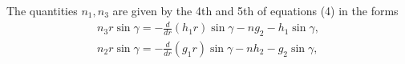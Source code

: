 The quantities \(n_1, n_3\) are given by the 4th and 5th of equations (4) in the forms
\[
\begin{array}{c}
n_3 r \sin \gamma=-\frac{d}{d r}\left(h_1 r\right) \sin \gamma - n g_2-h_1 \sin \gamma, \\
n_2 r \sin \gamma=-\frac{d}{d r}\left(g_1 r\right) \sin \gamma - n h_2-g_2 \sin \gamma,
\end{array}
\]
